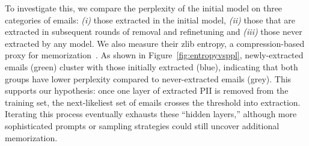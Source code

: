 To investigate this, we compare the perplexity of the initial model on three categories of emails: 
\textit{(i)} those extracted in the initial model, 
\textit{(ii)} those that are extracted in subsequent rounds of removal and refinetuning %
and 
\textit{(iii)} those never extracted by any model. 
We also measure their zlib entropy, a compression-based proxy for memorization~\citep{carlini-extraction, recite, zlib}. 
As shown in Figure~\ref{fig:entropyvsppl}, %
newly-extracted emails (green) cluster with those initially extracted (blue), indicating that both groups have lower perplexity compared to never-extracted emails (grey). This supports our hypothesis: once one layer of extracted PII is removed from the training set, the next-likeliest set of emails crosses the threshold into extraction. 
Iterating this process eventually exhausts these ``hidden layers,'' although more sophisticated prompts or sampling strategies could still uncover additional memorization.



